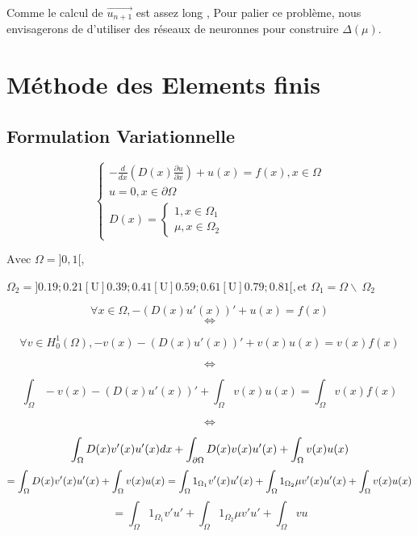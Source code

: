 \documentclass[12pt]{article}
\begin{document}
Comme le calcul de $ \vec{u_{n+1}} $ est  assez long , Pour palier ce problème, nous
envisagerons de d'utiliser des réseaux de neuronnes pour construire $ \Delta(\mu) $.

\section{Méthode des Elements finis}



\subsection{Formulation Variationnelle}

$$
\begin{cases} 
- \frac{d }{dx}(D(x)\frac{\partial u}{\partial x}) + u(x) = f(x) , x \in \Omega \\
u = 0 , x \in \partial \Omega \\
D(x) = 
\begin{cases} 
1 , x \in \Omega _{1} \\
\mu , x \in \Omega _{2}
\end{cases}
\end{cases}
$$

$
\text{Avec } \Omega =  ]0,1[ , 
$

$
\Omega _{2} = ]0.19; 0.21[ \text{U} ]0.39; 0.41[ \text{U} ]0.59; 0.61[ \text{U}]0.79; 0.81[ , \text{et }  \Omega _{1} = \Omega \backslash\ \Omega_{2} 
$


$$
\forall x \in \Omega , 
-(D(x)u'(x))' + u(x) = f(x) 
$$
$$\Longleftrightarrow $$ 

$$
\forall v \in H_{0}^{1}(\Omega) ,  
-v(x)-(D(x)u'(x))' + v(x)u(x) =  v(x)f(x) 
$$

$$\Longleftrightarrow $$ 

$$
\int_{\Omega} -v(x)-(D(x)u'(x))' + \int_{\Omega} v(x)u(x)
= 
\int_{\Omega} v(x)f(x)
$$

$$\Longleftrightarrow$$

$$
\int_{\Omega} D(x)v'(x)u'(x)dx + \int_{\partial \Omega} D(x)v(x)u'(x) + \int_{\Omega} v(x)u(x) \\
$$
$$
=  \int_{\Omega} D(x)v'(x)u'(x) + \int_{\Omega} v(x)u(x) \\
= \int_{\Omega} 1_{\Omega_{1}}v'(x)u'(x) + \int_{\Omega} 1_{\Omega_{2}}\mu v'(x)u'(x) + \int_{\Omega} v(x)u(x) \\
$$
$$
= \int_{\Omega} 1_{\Omega_{1}}v'u' + \int_{\Omega} 1_{\Omega_{2}}\mu v'u' + \int_{\Omega} vu 
$$
\end{document}
